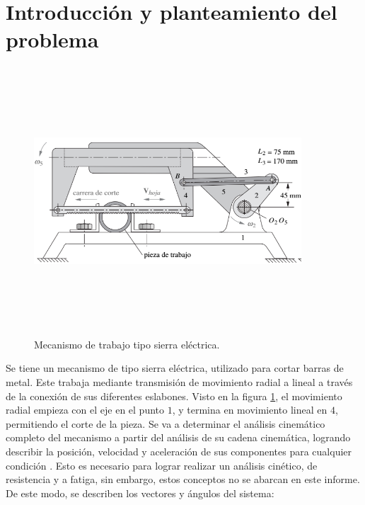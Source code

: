 \documentclass[12pt]{article}
\begin{document}
\section{Introducción y planteamiento del problema}
        \vspace{-10pt}
    \begin{figure} [H]
        \centerline{\includegraphics[width=10cm, height=10cm,keepaspectratio]{Sierra.png}}
        \caption{Mecanismo de trabajo tipo sierra eléctrica.}
        \vspace{-10pt}
        \label{Sierra}
    \end{figure}
Se tiene un mecanismo de tipo sierra eléctrica, utilizado para cortar barras de metal. Este trabaja mediante transmisión de movimiento radial a lineal a través de la conexión de sus diferentes eslabones.
Visto en la figura \ref{Sierra}, el movimiento radial empieza con el eje en el punto $1$, y termina en movimiento lineal en $4$, permitiendo el corte de la pieza. Se va a determinar el análisis cinemático completo del mecanismo a partir del análisis de su cadena cinemática, logrando describir la posición, velocidad y aceleración de sus componentes para cualquier condición \cite{mecanismo}. Esto es necesario para lograr realizar un análisis cinético, de resistencia y a fatiga, sin embargo, estos conceptos no se abarcan en este informe. De este modo, se describen los vectores y ángulos del sistema:
        \vspace{-10pt}
\end{document}
